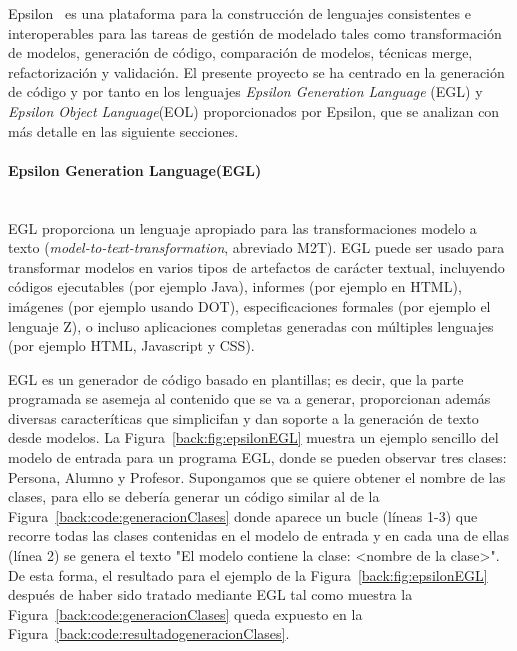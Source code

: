 Epsilon~\cite{kolovos:2008} es una plataforma para la construcción de lenguajes consistentes e interoperables para las tareas de gestión de modelado tales como transformación de modelos, generación de código, comparación de modelos, técnicas merge, refactorización y validación. El presente proyecto se ha centrado en la generación de código y por tanto en los lenguajes \emph{Epsilon Generation Language} (EGL) y \emph{Epsilon Object Language}(EOL) proporcionados por Epsilon, que se analizan con más detalle en las siguiente secciones.

\paragraph{Epsilon Generation Language(EGL)} \ \\

EGL proporciona un lenguaje apropiado para las transformaciones modelo a texto (\emph{model-to-text-transformation}, abreviado M2T). EGL puede ser usado para transformar modelos en varios tipos de artefactos de carácter textual, incluyendo códigos ejecutables (por ejemplo Java), informes (por ejemplo en HTML), imágenes (por ejemplo usando DOT), especificaciones formales (por ejemplo el lenguaje Z), o incluso aplicaciones completas generadas con múltiples lenguajes (por ejemplo HTML, Javascript y CSS).

EGL es un generador de código basado en plantillas; es decir, que la parte programada se asemeja al contenido que se va a generar, proporcionan además diversas caracteríticas que simplicifan y dan soporte a la generación de texto desde modelos. La Figura~\ref{back:fig:epsilonEGL} muestra un ejemplo sencillo del modelo de entrada para un programa EGL, donde se pueden observar tres clases: Persona, Alumno y Profesor. Supongamos que se quiere obtener el nombre de las clases, para ello se debería generar un código similar al de la Figura~\ref{back:code:generacionClases} donde aparece un bucle (líneas 1-3) que recorre todas las clases contenidas en el modelo de entrada y en cada una de ellas (línea 2) se genera el texto "El modelo contiene la clase: <nombre de la clase>". De esta forma, el resultado para el ejemplo de la Figura~\ref{back:fig:epsilonEGL} después de haber sido tratado mediante EGL tal como muestra la Figura~\ref{back:code:generacionClases} queda expuesto en la Figura~\ref{back:code:resultadogeneracionClases}.

